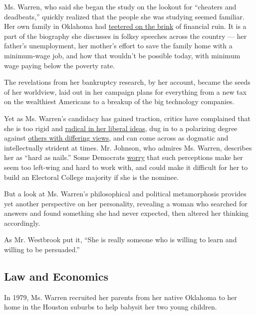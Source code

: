 Ms. Warren, who said she began the study on the lookout for ``cheaters
and deadbeats,'' quickly realized that the people she was studying
seemed familiar. Her own family in Oklahoma had
\href{https://www.nytimes3xbfgragh.onion/2019/06/24/us/politics/elizabeth-warren-republican-conservative-democrat.html}{teetered
on the brink} of financial ruin. It is a part of the biography she
discusses in folksy speeches across the country --- her father's
unemployment, her mother's effort to save the family home with a
minimum-wage job, and how that wouldn't be possible today, with minimum
wage paying below the poverty rate.

The revelations from her bankruptcy research, by her account, became the
seeds of her worldview, laid out in her campaign plans for everything
from a new tax on the wealthiest Americans to a breakup of the big
technology companies.

Yet as Ms. Warren's candidacy has gained traction, critics have
complained that she is too rigid and
\href{https://www.nytimes3xbfgragh.onion/2019/07/30/us/politics/democratic-presidential-debate-recap.html}{radical
in her liberal ideas}, dug in to a polarizing degree against
\href{https://dealbook.nytimes3xbfgragh.onion/2013/02/14/at-senate-hearing-warren-comes-out-swinging/}{others
with differing views}, and can come across as dogmatic and
intellectually strident at times. Mr. Johnson, who admires Ms. Warren,
describes her as ``hard as nails.'' Some Democrats
\href{https://www.nytimes3xbfgragh.onion/2019/08/15/us/politics/elizabeth-warren-2020-campaign.html}{worry}
that such perceptions make her seem too left-wing and hard to work with,
and could make it difficult for her to build an Electoral College
majority if she is the nominee.

But a look at Ms. Warren's philosophical and political metamorphosis
provides yet another perspective on her personality, revealing a woman
who searched for answers and found something she had never expected,
then altered her thinking accordingly.

As Mr. Westbrook put it, ``She is really someone who is willing to learn
and willing to be persuaded.''

\hypertarget{law-and-economics}{%
\subsection{Law and Economics}\label{law-and-economics}}

In 1979, Ms. Warren recruited her parents from her native Oklahoma to
her home in the Houston suburbs to help babysit her two young children.


